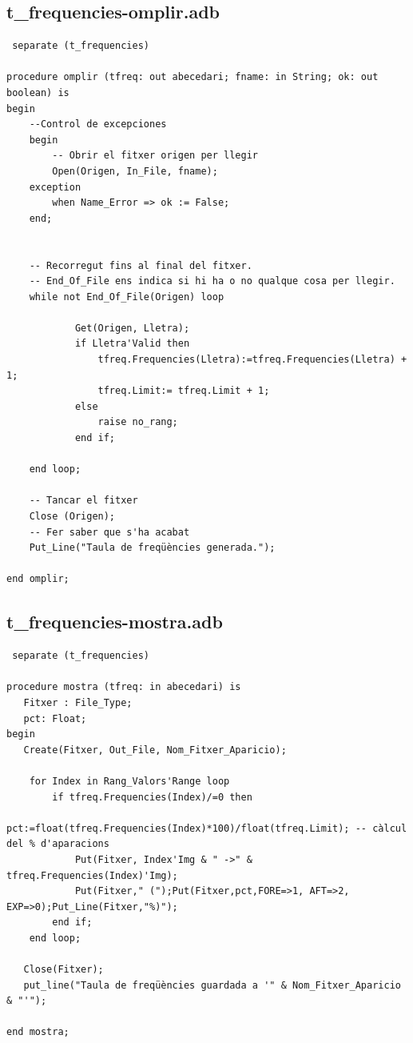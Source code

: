 \documentclass[a4paper,12pt]{article}
\begin{document}
\subsection{t\_frequencies-omplir.adb}
\begin{lstlisting}
 separate (t_frequencies)

procedure omplir (tfreq: out abecedari; fname: in String; ok: out boolean) is
begin
	--Control de excepciones
	begin 
		-- Obrir el fitxer origen per llegir
		Open(Origen, In_File, fname);
	exception 
		when Name_Error => ok := False; 
	end; 
	

	-- Recorregut fins al final del fitxer.
	-- End_Of_File ens indica si hi ha o no qualque cosa per llegir.
	while not End_Of_File(Origen) loop

			Get(Origen, Lletra);			
			if Lletra'Valid then
				tfreq.Frequencies(Lletra):=tfreq.Frequencies(Lletra) + 1;
				tfreq.Limit:= tfreq.Limit + 1;
			else
				raise no_rang;
			end if;

	end loop;
	
	-- Tancar el fitxer
	Close (Origen);
	-- Fer saber que s'ha acabat
	Put_Line("Taula de freqüències generada.");
   
end omplir;

\end{lstlisting}
\pagebreak
\subsection{t\_frequencies-mostra.adb}
\begin{lstlisting}
 separate (t_frequencies)

procedure mostra (tfreq: in abecedari) is
   Fitxer : File_Type;
   pct: Float;
begin
   Create(Fitxer, Out_File, Nom_Fitxer_Aparicio);
   
	for Index in Rang_Valors'Range loop
		if tfreq.Frequencies(Index)/=0 then
			pct:=float(tfreq.Frequencies(Index)*100)/float(tfreq.Limit); -- càlcul del % d'aparacions
			Put(Fitxer, Index'Img & " ->" & tfreq.Frequencies(Index)'Img);
			Put(Fitxer," (");Put(Fitxer,pct,FORE=>1, AFT=>2, EXP=>0);Put_Line(Fitxer,"%)");
		end if;
	end loop;
	
   Close(Fitxer);
   put_line("Taula de freqüències guardada a '" & Nom_Fitxer_Aparicio & "'");
   
end mostra;

\end{lstlisting}
\end{document}
